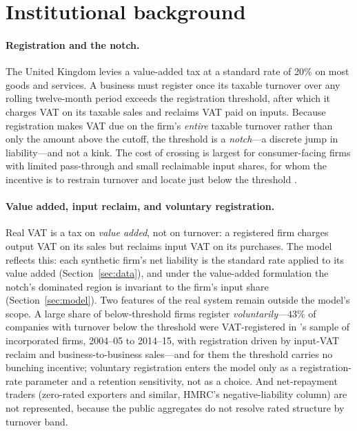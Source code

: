 \section{Institutional background}
\label{sec:background}

\paragraph{Registration and the notch.} The United Kingdom levies a value-added
tax at a standard rate of 20\% on most goods and services. A business must
register once its taxable turnover over any rolling twelve-month period exceeds
the registration threshold, after which it charges VAT on its taxable sales and
reclaims VAT paid on inputs. Because registration makes VAT due on the firm's
\emph{entire} taxable turnover rather than only the amount above the cutoff, the
threshold is a \emph{notch}---a discrete jump in liability---and not a kink. The
cost of crossing is largest for consumer-facing firms with limited pass-through
and small reclaimable input shares, for whom the incentive is to restrain
turnover and locate just below the threshold \citep{liuetal2021,klevenwaseem2013}.

\paragraph{Value added, input reclaim, and voluntary registration.} Real VAT is a
tax on \emph{value added}, not on turnover: a registered firm charges output VAT
on its sales but reclaims input VAT on its purchases. The model reflects this:
each synthetic firm's net liability is the standard rate applied to its value
added (Section~\ref{sec:data}), and under the value-added formulation the notch's dominated region is invariant to the
firm's input share (Section~\ref{sec:model}). Two features of the real system remain outside the
model's scope. A large share of below-threshold firms register
\emph{voluntarily}---$43\%$ of companies with turnover below the threshold
were VAT-registered in \citet{liuetal2021}'s sample of incorporated firms,
2004--05 to 2014--15, with registration driven by input-VAT reclaim and
business-to-business sales---and for them the threshold carries no bunching incentive; voluntary
registration enters the model only as a registration-rate parameter and a
retention sensitivity, not as a choice. And net-repayment traders (zero-rated
exporters and similar, HMRC's negative-liability column) are not represented,
because the public aggregates do not resolve rated structure by turnover band.

